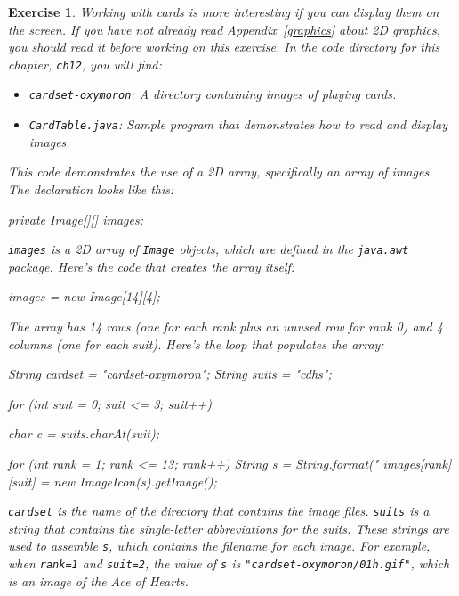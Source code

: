 \documentclass[12pt]{book}
\theoremstyle{exercise}
\newtheorem{exercise}{Exercise}[chapter]
\newcommand{\java}[1]{\verb"#1"}
\begin{document}
\begin{exercise}

Working with cards is more interesting if you can display them on the screen.
If you have not already read Appendix~\ref{graphics} about 2D graphics, you should read it before working on this exercise.
In the code directory for this chapter, {\tt ch12}, you will find:

\begin{itemize}

\item {\tt cardset-oxymoron}: A directory containing images of playing cards.

\item {\tt CardTable.java}: Sample program that demonstrates how to read and display images.

\end{itemize}

This code demonstrates the use of a 2D array, specifically an array of images.
The declaration looks like this:

\begin{code}
    private Image[][] images;
\end{code}

\java{images} is a 2D array of \java{Image} objects, which are defined in the \java{java.awt} package.
Here's the code that creates the array itself:

\begin{code}
    images = new Image[14][4];
\end{code}

The array has 14 rows (one for each rank plus an unused row for rank 0) and 4 columns (one for each suit).
Here's the loop that populates the array:

\begin{code}
    String cardset = "cardset-oxymoron";
    String suits = "cdhs";

    for (int suit = 0; suit <= 3; suit++) {
        char c = suits.charAt(suit);

        for (int rank = 1; rank <= 13; rank++) {
            String s = String.format("%
            images[rank][suit] = new ImageIcon(s).getImage();
        }
    }
\end{code}

\java{cardset} is the name of the directory that contains the image files.
\java{suits} is a string that contains the single-letter abbreviations for the suits.
These strings are used to assemble \java{s}, which contains the filename for each image.
For example, when \java{rank=1} and \java{suit=2}, the value of \java{s} is \verb|"cardset-oxymoron/01h.gif"|, which is an image of the Ace of Hearts.


\end{exercise}
\end{document}
